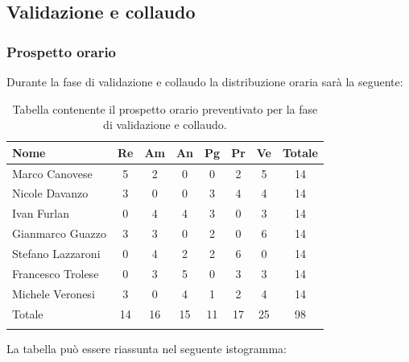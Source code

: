 \subsection{Validazione e collaudo}
\subsubsection{Prospetto orario}
Durante la fase di validazione e collaudo la distribuzione oraria sarà la seguente:

\begin{longtable}{|l|c|c|c|c|c|c|c|}
	\hline
	\rowcolor{lighter-grayer}
	\textbf{Nome}     & \textbf{Re} & \textbf{Am} & \textbf{An} & \textbf{Pg} & \textbf{Pr} & \textbf{Ve} & \textbf{Totale} \\
	\hline
	\endfirsthead

	\hline
	Marco Canovese    & 5           & 2           & 0           & 0           & 2           & 5           & 14              \\
	\hline
	\hline
	Nicole Davanzo    & 3           & 0           & 0           & 3           & 4           & 4           & 14              \\
	\hline
	\hline
	Ivan Furlan       & 0           & 4           & 4           & 3           & 0           & 3           & 14              \\
	\hline
	\hline
	Gianmarco Guazzo  & 3           & 3           & 0           & 2           & 0           & 6           & 14              \\
	\hline
	\hline
	Stefano Lazzaroni & 0           & 4           & 2           & 2           & 6           & 0           & 14              \\
	\hline
	\hline
	Francesco Trolese & 0           & 3           & 5           & 0           & 3           & 3           & 14              \\
	\hline
	\hline
	Michele Veronesi  & 3           & 0           & 4           & 1           & 2           & 4           & 14              \\
	\hline
	\hline
	Totale            & 14          & 16          & 15          & 11          & 17          & 25          & 98              \\
	\hline
	\rowcolor{white}
	\caption{Tabella contenente il prospetto orario preventivato per la fase di validazione e collaudo.}
\end{longtable}


La tabella può essere riassunta nel seguente istogramma:

